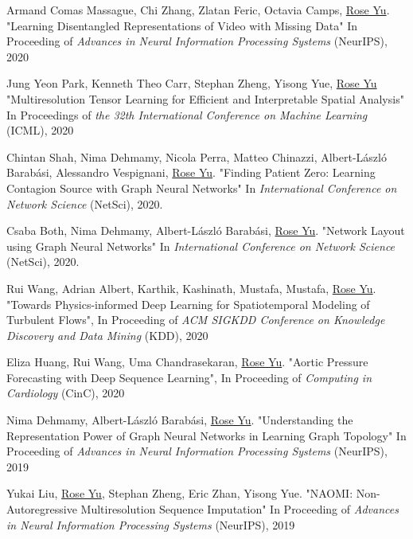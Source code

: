 \documentclass[margin,line]{res}
\begin{document}
\begin{resume}
\begin{enumerate}[label={[C\arabic*]}]
\item Armand Comas Massague, Chi Zhang, Zlatan Feric, Octavia Camps,  \underline{Rose Yu}.
"Learning Disentangled Representations of Video with Missing Data"
  In  Proceeding of \textit{Advances in Neural Information Processing Systems} (NeurIPS), 2020
 
      
\item Jung Yeon Park, Kenneth Theo Carr, Stephan Zheng, Yisong Yue, \underline{Rose Yu}
"Multiresolution Tensor Learning for Efficient and Interpretable Spatial Analysis"
 In Proceedings  of  \textit{the 32th International Conference on Machine Learning} (ICML), 2020
  
\item Chintan Shah, Nima Dehmamy, Nicola Perra, Matteo Chinazzi, Albert-László Barabási, Alessandro Vespignani, \underline{Rose Yu}.
"Finding Patient Zero: Learning Contagion Source with Graph Neural Networks"
 In \textit{International Conference on Network Science} (NetSci),  2020. 
     
 \item Csaba Both, Nima Dehmamy,  Albert-László Barabási, \underline{Rose Yu}.
"Network Layout using Graph Neural Networks"
 In \textit{International Conference on Network Science} (NetSci),  2020.  

\item Rui Wang, Adrian Albert,  Karthik, Kashinath, Mustafa, Mustafa,  \underline{Rose Yu}. "Towards Physics-informed Deep Learning for Spatiotemporal Modeling of Turbulent Flows", In  Proceeding of\textit{ ACM SIGKDD Conference on Knowledge Discovery and Data Mining} (KDD), 2020

\item Eliza Huang, Rui Wang, Uma Chandrasekaran, \underline{Rose Yu}.  "Aortic Pressure Forecasting with Deep Sequence Learning", In  Proceeding of  \textit{Computing in Cardiology} (CinC), 2020 

\item Nima Dehmamy, Albert-L\'aszl\'o Barab\'asi, \underline{Rose Yu}.  "Understanding the Representation Power of Graph Neural Networks in Learning Graph Topology" In Proceeding of  \textit{Advances in Neural Information Processing Systems} (NeurIPS), 2019
 
 
\item  Yukai Liu, \underline{Rose Yu}, Stephan Zheng, Eric Zhan, Yisong Yue. "NAOMI: Non-Autoregressive Multiresolution Sequence Imputation" In  Proceeding of  \textit{Advances in Neural Information Processing Systems} (NeurIPS), 2019



\end{enumerate}
\end{resume}
\end{document}
